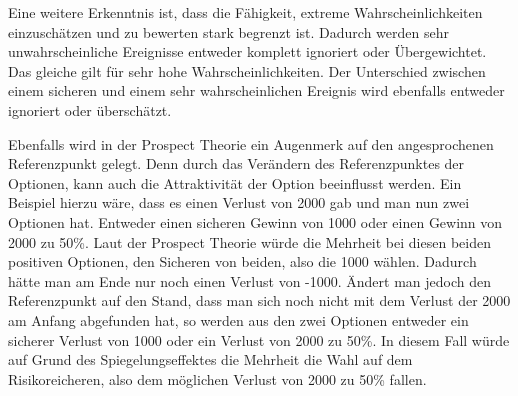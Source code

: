 Eine weitere Erkenntnis ist, dass die Fähigkeit, extreme Wahrscheinlichkeiten einzuschätzen und zu bewerten stark begrenzt ist. Dadurch werden sehr unwahrscheinliche Ereignisse entweder komplett ignoriert oder Übergewichtet. Das gleiche gilt für sehr hohe Wahrscheinlichkeiten. Der Unterschied zwischen einem sicheren und einem sehr wahrscheinlichen Ereignis wird ebenfalls entweder ignoriert oder überschätzt. 

Ebenfalls wird in der Prospect Theorie ein Augenmerk auf den angesprochenen Referenzpunkt gelegt. Denn durch das Verändern des Referenzpunktes der Optionen, kann auch die Attraktivität der Option beeinflusst werden. Ein Beispiel hierzu wäre, dass es einen Verlust von 2000 gab und man nun zwei Optionen hat. Entweder einen sicheren Gewinn von 1000 oder einen Gewinn von 2000 zu 50\%. Laut der Prospect Theorie würde die Mehrheit bei diesen beiden positiven Optionen, den Sicheren von beiden, also die 1000 wählen. Dadurch hätte man am Ende nur noch einen Verlust von -1000. Ändert man jedoch den Referenzpunkt auf den Stand, dass man sich noch nicht mit dem Verlust der 2000 am Anfang abgefunden hat, so werden aus den zwei Optionen entweder ein sicherer Verlust von 1000 oder ein Verlust von 2000 zu 50\%. In diesem Fall würde auf Grund des Spiegelungseffektes die Mehrheit die Wahl auf dem Risikoreicheren, also dem möglichen Verlust von 2000 zu 50\% fallen. \parencite[S. 288]{Kahneman.2013}